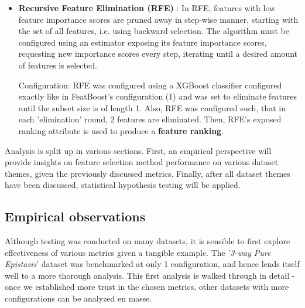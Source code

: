 \documentclass{article}
\begin{document}
\begin{itemize}
    Configuration for MultiSURF was set such to rank the entire set of features, otherwise all other settings lay at default. Subsequently, the MultiSURF 'top features' attribute was used to produce a \textbf{feature ranking}.
    
    \item \textbf{Recursive Feature Elimination (RFE)} \citep{guyon2002gene}: In RFE, features with low feature importance scores are pruned away in step-wise manner, starting with the set of all features, i.e. using backward selection. The algorithm must be configured using an estimator exposing its feature importance scores, requesting new importance scores every step, iterating until a desired amount of features is selected.
    
    Configuration: RFE was configured using a XGBoost classifier configured exactly like in FeatBoost's configuration (1) and was set to eliminate features until the subset size is of length 1. Also, RFE was configured such, that in each 'elimination' round, 2 features are eliminated. Then, RFE's exposed ranking attribute is used to produce a \textbf{feature ranking}.
\end{itemize}

Analysis is split up in various sections. First, an empirical perspective will provide insights on feature selection method performance on various dataset themes, given the previously discussed metrics. Finally, after all dataset themes have been discussed, statistical hypothesis testing will be applied.

\subsection{Empirical observations}
Although testing was conducted on many datasets, it is sensible to first explore effectiveness of various metrics given a tangible example. The '\textit{3-way Pure Epistasis}' dataset was benchmarked at only 1 configuration, and hence lends itself well to a more thorough analysis. This first analysis is walked through in detail - once we established more trust in the chosen metrics, other datasets with more configurations can be analyzed en masse.
\end{document}
